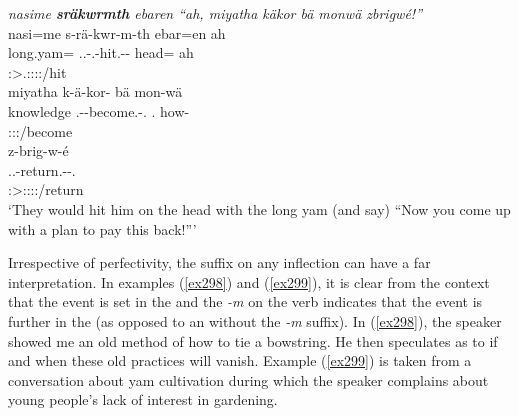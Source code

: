 \begin{exe}
	\ex \emph{nasime \textbf{sräkwrmth} ebaren ``ah, miyatha käkor bä monwä zbrigwé!''}\\
	\glll nasi=me s-rä-kwr-m-th ebar=en ah\\
	long.yam=\Ins{} \Tsg.\Masc.\Bet-\Irr.\Ndu-hit.\Rs-\Dur-\Stnsg{} head=\Loc{} ah\\
	{} \footnotesize{\Stpl:\Sbj>\Tsg.\Masc:\Obj:\Irr:\Pfv:\Bg/hit} {} {}\\
	\sn
	\glll miyatha k-ä-kor-\Zero{} bä mon-wä\\
	knowledge \M.\Bet-\Ndu-become.\Rs-\Ssg.\Imp{} \Second.\Abs{} how-\Emph{}\\
	{} \footnotesize{\Ssg:\Sbj:\Imp:\Pfv/become} {} {}\\
	\sn
	\glll z-brig-w-é\\
	\Tsg.\F.\Bet-return.\Ext-\Ndu-\Ssg.\Imp\\
	\footnotesize{\Ssg:\Sbj>\Tsg:\F:\Obj:\Imp:\Ipfv/return}\\
	\trans `They would hit him on the head with the long yam (and say) ``Now you come up with a plan to pay this back!'''
	\label{ex297}
\end{exe}

Irrespective of perfectivity, the  suffix on any  inflection can have a far  interpretation. In examples (\ref{ex298}) and (\ref{ex299}), it is clear from the context that the event is set in the  and the \emph{-m} on the verb indicates that the event is further in the  (as opposed to an  without the \emph{-m} suffix). In (\ref{ex298}), the speaker showed me an old method of how to tie a bowstring. He then speculates as to if and when these old practices will vanish. Example (\ref{ex299}) is taken from a conversation about yam cultivation during which the speaker complains about young people's lack of interest in gardening.

